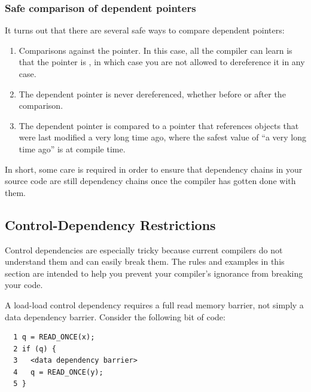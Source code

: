 
\subsubsection{Safe comparison of dependent pointers}
It turns out that there are several safe ways to compare dependent
pointers:

\begin{enumerate}
\item	Comparisons against the  pointer.
	In this case, all the compiler can learn is that the pointer
	is , in which case you are not allowed to
	dereference it in any case.
\item	The dependent pointer is never dereferenced, whether before or
	after the comparison.
\item	The dependent pointer is compared to a pointer that references
	objects that were last modified a very long time ago, where
	the safest value of ``a very long time ago'' is at compile time.
\end{enumerate}



In short, some care is required in order to ensure that dependency
chains in your source code are still dependency chains once the
compiler has gotten done with them.

\subsection{Control-Dependency Restrictions}
\label{sec:memorder:Control-Dependency Restrictions}

Control dependencies are especially tricky because current compilers
do not understand them and can easily break them.
The rules and examples in this section are intended to help you
prevent your compiler's ignorance from breaking your code.

A load-load control dependency requires a full read memory barrier,
not simply a data dependency barrier.
Consider the following bit of code:

\vspace{5pt}
\begin{minipage}[t]{\columnwidth}
\scriptsize
\begin{verbatim}
  1 q = READ_ONCE(x);
  2 if (q) {
  3   <data dependency barrier>
  4   q = READ_ONCE(y);
  5 }
\end{verbatim}
\end{minipage}
\vspace{5pt}

